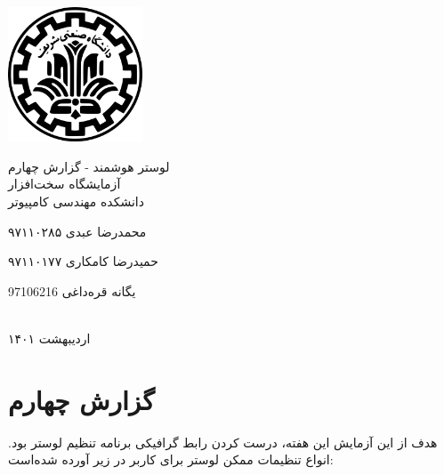 \documentclass[12pt,a4paper]{article}
\begin{document}
	\thispagestyle{empty}
	\vspace*{0mm}
	\centerline{\includegraphics[height=4cm]{logo.png}}
	\vspace*{5mm}
	\begin{center}
		{\Huge
لوستر هوشمند - گزارش چهارم
}
\\[1cm]
آزمایشگاه سخت‌افزار
\\[1cm]
دانشکده مهندسی کامپیوتر
\\[4cm]
{\large
محمدرضا عبدی ۹۷۱۱۰۲۸۵

حمیدرضا کامکاری ۹۷۱۱۰۱۷۷

یگانه قره‌داغی 97106216
}
	\\[5cm]
	اردیبهشت ۱۴۰۱
	\end{center}
\newpage

\section*{گزارش چهارم}
هدف از این آزمایش این هفته، درست کردن رابط گرافیکی برنامه تنظیم لوستر بود. انواع تنظیمات ممکن لوستر برای کاربر در زیر آورده شده‌است:
\end{document}
